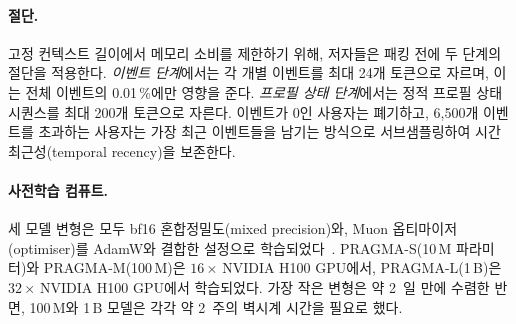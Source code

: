 \paragraph*{절단.}
고정 컨텍스트 길이에서 메모리 소비를 제한하기 위해, 저자들은 패킹 전에 두 단계의 절단을 적용한다.
\emph{이벤트 단계}에서는 각 개별 이벤트를 최대 24개 토큰으로 자르며, 이는 전체 이벤트의 0.01\,\%에만 영향을 준다.
\emph{프로필 상태 단계}에서는 정적 프로필 상태 시퀀스를 최대 200개 토큰으로 자른다.
이벤트가 0인 사용자는 폐기하고, 6{,}500개 이벤트를 초과하는 사용자는 가장 최근 이벤트들을 남기는 방식으로 서브샘플링하여 시간 최근성(temporal recency)을 보존한다.

\paragraph*{사전학습 컴퓨트.}
세 모델 변형은 모두 bf16 혼합정밀도(mixed precision)와, Muon 옵티마이저(optimiser)를 AdamW와 결합한 설정으로 학습되었다~\citep{loshchilov2019adamw,jordan2024muon,liu2025muon}.
PRAGMA-S(10\,M 파라미터)와 PRAGMA-M(100\,M)은 $16{\times}$\,NVIDIA H100 GPU에서, PRAGMA-L(1\,B)은 $32{\times}$\,NVIDIA H100 GPU에서 학습되었다.
가장 작은 변형은 약 2~일 만에 수렴한 반면, 100\,M와 1\,B 모델은 각각 약 2~주의 벽시계 시간을 필요로 했다.
